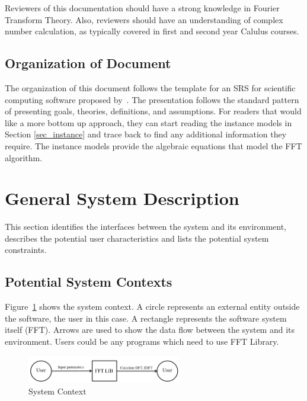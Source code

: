 \documentclass[12pt]{article}
\newcommand{\famname}{FFT}
\begin{document}
Reviewers of this documentation should have a strong knowledge in Fourier
Transform Theory. Also, reviewers should have an understanding of complex
number calculation, as typically covered in first and second year Calulus courses.

\subsection{Organization of Document} The organization of this document follows
the template for an SRS for scientific computing software proposed
by~\cite{SmithAndLai2005}. The presentation follows the standard pattern of
presenting goals, theories, definitions, and assumptions. For readers that would
like a more bottom up approach, they can start reading the instance models in
Section \ref{sec_instance} and trace back to find any additional information
they require. The instance models provide the algebraic equations that model the
FFT algorithm.


\section{General System Description}

This section identifies the interfaces between the system and its environment,
describes the potential user characteristics and lists the potential system
constraints.

\subsection{Potential System Contexts}

Figure~\ref{Fig_SystemContext} shows the system context. A circle represents an
external entity outside the software, the user in this case. A rectangle
represents the software system itself (\famname{}). Arrows are used to show the
data flow between the system and its environment. Users could be any programs
which need to use FFT Library.

\begin{figure}[h!] \begin{center}
\includegraphics[width=0.6\textwidth]{SystemContextFigure} \caption{System
Context} \label{Fig_SystemContext} \end{center} \end{figure}
\end{document}
